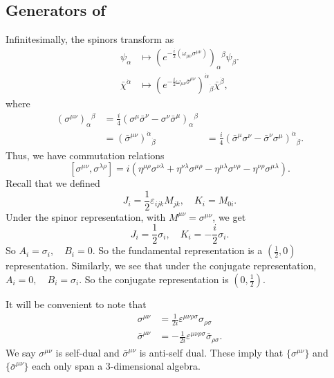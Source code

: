 \documentclass[a4paper]{article}
\begin{document}
\subsection{Generators of } %
Infinitesimally, the spinors transform as
\begin{align*}
  \psi_\alpha &\mapsto (e^{-\frac{i}{2} (\omega_{\mu\nu} \sigma^{\mu\nu})})_\alpha\!^\beta \psi_\beta.\\
  \bar{\chi}^{\dot{\alpha}}&\mapsto (e^{-\frac{i}{2} \omega_{\mu\nu} \bar{\sigma}^{\mu\nu}})^{\dot{\alpha}}\!_{\dot{\beta}} \bar{\chi}^{\dot{\beta}},
\end{align*}
where
\begin{align*}
(\sigma^{\mu\nu})_\alpha\!^\beta &= \frac{i}{4} (\sigma^\mu \bar{\sigma}^\nu - \sigma^\nu \bar{\sigma}^\mu)_\alpha\!^\beta\\&=
  (\bar{\sigma}^{\mu\nu})^{\dot{\alpha}}\!_{\dot{\beta}} &= \frac{i}{4} (\bar{\sigma}^\mu \sigma^\nu - \bar{\sigma}^\nu \sigma^\mu)^{\dot{\alpha}}\!_{\dot{\beta}}.
\end{align*}
Thus, we have commutation relations
\[
  [\sigma^{\mu\nu}, \sigma^{\lambda\rho}] = i (\eta^{\mu\rho} \sigma^{\nu\lambda} + \eta^{\nu\lambda} \sigma^{\mu\rho} - \eta^{\mu\lambda} \sigma^{\nu\rho} - \eta^{\nu\rho} \sigma^{\mu\lambda}).
\]
Recall that we defined
\[
  J_i = \frac{1}{2} \varepsilon_{ijk} M_{jk}, \quad K_i = M_{0i}.
\]
Under the spinor representation, with $M^{\mu\nu} = \sigma^{\mu\nu}$, we get
\[
  J_i = \frac{1}{2} \sigma_i,\quad K_i = - \frac{i}{2} \sigma_i.
\]
So $A_i = \sigma_i,\quad B_i = 0$. So the fundamental representation is a $(\frac{1}{2}, 0)$ representation. Similarly, we see that under the conjugate representation, $A_i = 0,\quad B_i = \sigma_i$. So the conjugate representation is $(0, \frac{1}{2})$.

It will be convenient to note that
\begin{align*}
  \sigma^{\mu\nu} &= \frac{1}{2i} \varepsilon^{\mu\nu\rho\sigma} \sigma_{\rho\sigma}\\
  \bar{\sigma}^{\mu\nu} &= -\frac{1}{2i} \varepsilon^{\mu\nu\rho\sigma} \bar{\sigma}_{\rho\sigma}.
\end{align*}
We say $\sigma^{\mu\nu}$ is self-dual and $\bar{\sigma}^{\mu\nu}$ is anti-self dual. These imply that $\{\sigma^{\mu\nu}\}$ and $\{\bar{\sigma}^{\mu\nu}\}$ each only span a $3$-dimensional algebra.
\end{document}
